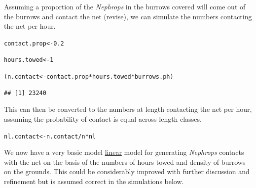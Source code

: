 \documentclass[12pt]{article}\usepackage[]{graphicx}\usepackage[]{color}
\makeatletter
\newcommand{\hlnum}[1]{\textcolor[rgb]{0.686,0.059,0.569}{#1}}%
\newcommand{\hlopt}[1]{\textcolor[rgb]{0,0,0}{#1}}%
\newcommand{\hlstd}[1]{\textcolor[rgb]{0.345,0.345,0.345}{#1}}%
\newcommand{\hlkwb}[1]{\textcolor[rgb]{0.69,0.353,0.396}{#1}}%
\newenvironment{kframe}{%
 \def\at@end@of@kframe{}%
 \ifinner\ifhmode%
  \def\at@end@of@kframe{\end{minipage}}%
  \begin{minipage}{\columnwidth}%
 \fi\fi%
 \def\FrameCommand##1{\hskip\@totalleftmargin \hskip-\fboxsep
 \colorbox{shadecolor}{##1}\hskip-\fboxsep
     \hskip-\linewidth \hskip-\@totalleftmargin \hskip\columnwidth}%
 \MakeFramed {\advance\hsize-\width
   \@totalleftmargin\z@ \linewidth\hsize
   \@setminipage}}%
 {\par\unskip\endMakeFramed%
 \at@end@of@kframe}
\newenvironment{knitrout}{}{} %
\makeatother
\begin{document}
Assuming a proportion of the \emph{Nephrops} in the burrows covered will come out of the burrows and contact the net (revise), we can simulate the numbers contacting the net per hour. 
\begin{knitrout}\footnotesize
{}\color{fgcolor}\begin{kframe}
\begin{alltt}
\hlstd{contact.prop} \hlkwb{<-} \hlnum{0.2}

\hlstd{hours.towed} \hlkwb{<-} \hlnum{1}

\hlstd{(n.contact} \hlkwb{<-} \hlstd{contact.prop} \hlopt{*} \hlstd{hours.towed} \hlopt{*} \hlstd{burrows.ph)}
\end{alltt}
\begin{verbatim}
## [1] 23240
\end{verbatim}
\end{kframe}
\end{knitrout}

This can then be converted to the numbers at length contacting the net per hour, assuming the probability of contact is equal across length classes.
\begin{knitrout}\footnotesize
{}\color{fgcolor}\begin{kframe}
\begin{alltt}
\hlstd{nl.contact} \hlkwb{<-} \hlstd{n.contact}\hlopt{/}\hlstd{n} \hlopt{*} \hlstd{nl}
\end{alltt}
\end{kframe}
\end{knitrout}

We now have a very basic model \underline{linear} model for generating \emph{Nephrops} contacts with the net on the basis of the numbers of hours towed and density of burrows on the grounds. This could be considerably improved with further discussion and refinement but is assumed correct in the simulations below.
\end{document}
